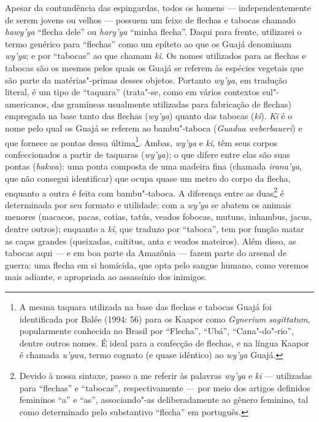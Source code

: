 Apesar da contundência das espingardas, todos os homens ---
independentemente de serem jovens ou velhos --- possuem um feixe de
flechas e tabocas chamado \emph{hawy'ya} ``flecha dele'' ou
\emph{hary'ya} ``minha flecha''. Daqui para frente, utilizarei o termo
genérico para ``flechas'' como um epíteto ao que os Guajá denominam
\emph{wy'ya}; e por ``tabocas'' ao que chamam \emph{kĩ}. Os nomes
utilizados para as flechas e tabocas são os mesmos pelos quais os Guajá
se referem às espécies vegetais que são parte da matérias"-primas desses
objetos. Portanto \emph{wy'ya}, em tradução literal, é um tipo de
``taquara'' (trata"-se, como em vários contextos sul"-americanos, das
gramíneas usualmente utilizadas para fabricação de flechas) empregada na
base tanto das flechas (\emph{wy'ya}) quanto das tabocas (\emph{kĩ}).
\emph{Kĩ} é o nome pelo qual os Guajá se referem ao bambu"-taboca
(\emph{Guadua} \emph{weberbaueri}) e que fornece as pontas dessa
última\footnote{A mesma taquara utilizada na base das flechas e tabocas
  Guajá foi identificada por Balée (1994: 56) para os Kaapor como
  \emph{Gynerium} \emph{sagittatum}, popularmente conhecida no Brasil
  por ``Flecha'', ``Ubá'', ``Cana"-do"-rio'', dentre outros nomes. É ideal para
  a confecção de flechas, e na língua Kaapor é chamada \emph{u'ywa},
  termo cognato (e quase idêntico) ao \emph{wy'ya} Guajá.}. Ambas,
\emph{wy'ya} e \emph{kĩ}, têm seus corpos confeccionados a partir de
taquaras (\emph{wy'ya}); o que difere entre elas são suas pontas
(\emph{hakwa}): uma ponta composta de uma madeira fina (chamada
\emph{irana'ya}, que não consegui identificar) que ocupa quase um metro
do corpo da flecha, enquanto a outra é feita com bambu"-taboca. A
diferença entre as duas\footnote{Devido à nossa sintaxe, passo a me
  referir às palavras \emph{wy'ya} e \emph{kĩ} --- utilizadas para
  ``flechas'' e ``tabocas'', respectivamente --- por meio dos artigos
  definidos femininos ``a'' e ``as'', associando"-as deliberadamente ao
  gênero feminino, tal como determinado pelo substantivo ``flecha'' em
  português.} é determinada por seu formato e utilidade: com a
\emph{wy'ya} se abatem os animais menores (macacos, pacas, cotias,
tatús, veados fobocas, mutuns, inhambus, jacus, dentre outros); enquanto
a \emph{kĩ}, que traduzo por ``taboca'', tem por função matar as caças
grandes (queixadas, caititus, anta e veados mateiros). Além disso, as
tabocas aqui --- e em boa parte da Amazônia --- fazem parte do arsenal de
guerra: uma flecha em si homicida, que opta pelo sangue humano, como
veremos mais adiante, e apropriada ao assassínio dos inimigos.

